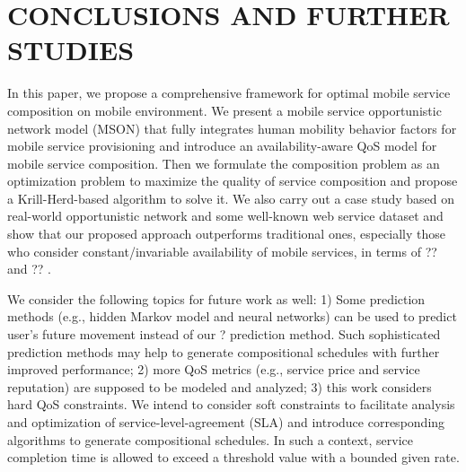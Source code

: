 \documentclass[10pt,journal,compsoc]{IEEEtran}
\begin{document}


\section{CONCLUSIONS AND FURTHER STUDIES}
In this paper, we propose a comprehensive framework for optimal mobile service composition on mobile environment. We present a mobile service opportunistic network model (MSON) that fully integrates human mobility behavior factors for mobile service provisioning and introduce an availability-aware QoS model for mobile service composition. Then we formulate the composition problem as an optimization problem to maximize the quality of service composition and propose a Krill-Herd-based algorithm to solve it. We also carry out a case study based on real-world opportunistic network and some well-known web service dataset and show that our proposed approach outperforms traditional ones, especially those who consider constant/invariable availability of mobile services, in terms of ?? and ?? .

We consider the following topics for future work as well: 1) Some prediction methods (e.g., hidden Markov model and neural networks) can be used to predict user's future movement instead of our ? prediction method. Such sophisticated prediction methods may help to generate compositional schedules with further improved performance; 2) more QoS metrics (e.g., service price and service reputation) are supposed to be modeled and  analyzed; 3) this work considers hard QoS constraints.
We intend to consider soft constraints to facilitate analysis and optimization of service-level-agreement (SLA) and introduce corresponding algorithms to generate compositional schedules. In such a context, service completion time is allowed to exceed a threshold value with a bounded given rate. 

​		
​	



\end{document}
